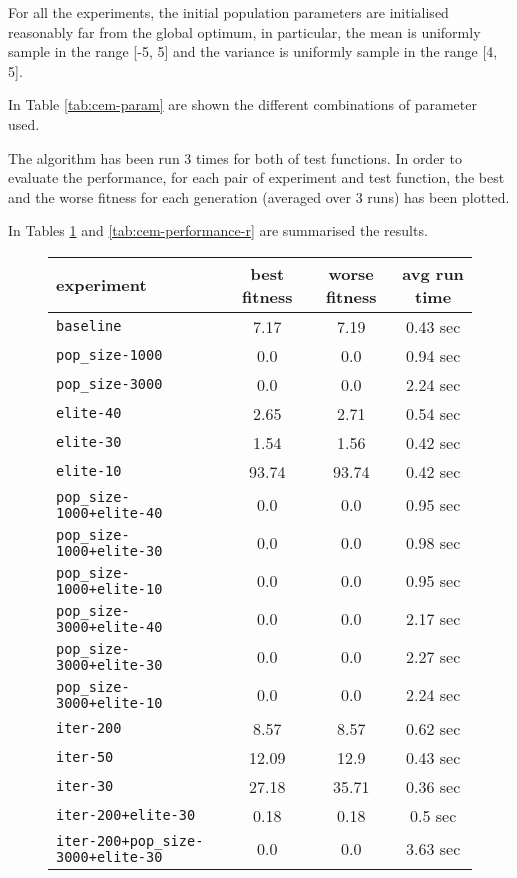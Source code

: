 For all the experiments, the initial population parameters are initialised reasonably far from the global optimum, in particular, the mean is uniformly sample in the range [-5, 5] and the variance is uniformly sample in the range [4, 5].

In Table \ref{tab:cem-param} are shown the different combinations of parameter used.
\bigskip

The algorithm has been run 3 times for both of test functions. 
In order to evaluate the performance, for each pair of experiment and test function, the best and the worse fitness for each generation (averaged over 3 runs) has been plotted. 
 
In Tables \ref{tab:cem-performance-s} and \ref{tab:cem-performance-r} are summarised the results. 
\bigskip

\begin{figure}[htb]
	\centering
	
	\begin{tabular}{lccc}
		\toprule
		\textbf{experiment} & \textbf{best fitness} & \textbf{worse fitness} & \textbf{avg run time} \\
		\midrule
		\texttt{baseline 						}		 &	  7.17 &	   7.19 &	  0.43 sec \\
		\texttt{pop\_size-1000 					}		&	   0.0 &	    0.0 &	  0.94 sec \\
		\texttt{pop\_size-3000 					}		&	   0.0 &	    0.0 &	  2.24 sec \\
		\texttt{elite-40 						}		 &	  2.65 &	   2.71 &	  0.54 sec \\
		\texttt{elite-30 						}		 &	  1.54 &	   1.56 &	  0.42 sec \\
		\texttt{elite-10 						}		 &	 93.74 &	  93.74 &	  0.42 sec \\
		\texttt{pop\_size-1000+elite-40 		}	 &	   0.0 &	    0.0 &	  0.95 sec \\
		\texttt{pop\_size-1000+elite-30 		}	 &	   0.0 &	    0.0 &	  0.98 sec \\
		\texttt{pop\_size-1000+elite-10 		}	 &	   0.0 &	    0.0 &	  0.95 sec \\
		\texttt{pop\_size-3000+elite-40 		}	 &	   0.0 &	    0.0 &	  2.17 sec \\
		\texttt{pop\_size-3000+elite-30 		}	 &	   0.0 &	    0.0 &	  2.27 sec \\
		\texttt{pop\_size-3000+elite-10 		}	 &	   0.0 &	    0.0 &	  2.24 sec \\
		\texttt{iter-200 						}		&	  8.57 &	   8.57 &	  0.62 sec \\
		\texttt{iter-50 						}	&	 12.09 &	   12.9 &	  0.43 sec \\
		\texttt{iter-30 						}	&	 27.18 &	  35.71 &	  0.36 sec \\
		\texttt{iter-200+elite-30 				}	&	  0.18 &	   0.18 &	   0.5 sec \\
		\texttt{iter-200+pop\_size-3000+elite-30} 	 &	   0.0 &	    0.0 &	  3.63 sec \\
		\bottomrule
	\end{tabular}
	\label{tab:cem-performance-s}
\end{figure}

